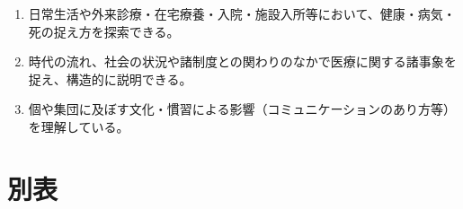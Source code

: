 \begin{enumerate}
\def\labelenumi{\arabic{enumi}.}
\tightlist
\item
  日常生活や外来診療・在宅療養・入院・施設入所等において、健康・病気・死の捉え方を探索できる。
\item
  時代の流れ、社会の状況や諸制度との関わりのなかで医療に関する諸事象を捉え、構造的に説明できる。
\item
  個や集団に及ぼす文化・慣習による影響（コミュニケーションのあり方等）を理解している。
  \newpage
\end{enumerate}

\hypertarget{ux5225ux8868}{%
\section{別表}\label{ux5225ux8868}}

